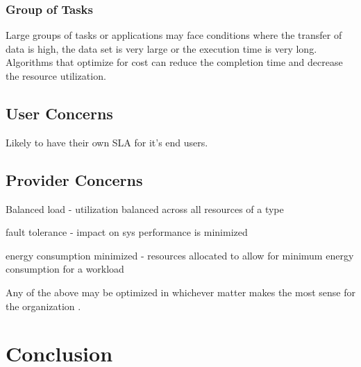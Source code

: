 \documentclass[12pt]{article}
\begin{document}
\subsubsection*{Group of Tasks}

Large groups of tasks or applications may face conditions where the transfer of data is high, the data set is very large or the execution time is very long. Algorithms that optimize for cost can reduce the completion time and decrease the resource utilization.


\subsection{User Concerns}

\cite{Jennings2015}
Likely to have their own SLA for it's end users.


\subsection{Provider Concerns} \label{provider-concerns}



Balanced load - utilization balanced across all resources of a type

fault tolerance - impact on sys performance is minimized

energy consumption minimized - resources allocated to allow for minimum energy consumption for a workload

Any of the above may be optimized in whichever matter makes the most sense for the organization \cite{Jennings2015}.




\section{Conclusion} \label{sec:conclusion}


\printbibliography
\end{document}
